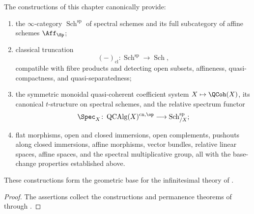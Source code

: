 \begin{theorem}
\label{thm:spectral-algebraic-geometry-package}
The constructions of this chapter canonically provide:
\begin{enumerate}[label=(\roman*)]
    \item the $\infty$-category $\operatorname{Sch}^{\mathrm{sp}}$ of
    spectral schemes and its full subcategory of affine schemes
    $\Aff_{\Sp}$;

    \item classical truncation
    \[
        (-)_{\mathrm{cl}}
        \colon
        \operatorname{Sch}^{\mathrm{sp}}
        \longrightarrow
        \operatorname{Sch},
    \]
    compatible with fibre products and detecting open subsets,
    affineness, quasi-compactness, and quasi-separatedness;

    \item the symmetric monoidal quasi-coherent coefficient system
    $X\mapsto\QCoh(X)$, its canonical $t$-structure on spectral schemes,
    and the relative spectrum functor
    \[
        \Spec_X
        \colon
        \operatorname{QCAlg}(X)^{\mathrm{cn},\op}
        \longrightarrow
        \operatorname{Sch}^{\mathrm{sp}}_{/X};
    \]

    \item flat morphisms, open and closed immersions, open complements,
    pushouts along closed immersions, affine morphisms, vector bundles,
    relative linear spaces, affine spaces, and the spectral
    multiplicative group, all with the base-change properties established
    above.
\end{enumerate}
These constructions form the geometric base for the infinitesimal theory
of .
\end{theorem}

\begin{proof}
The assertions collect the constructions and permanence theorems of
 through
.
\end{proof}

